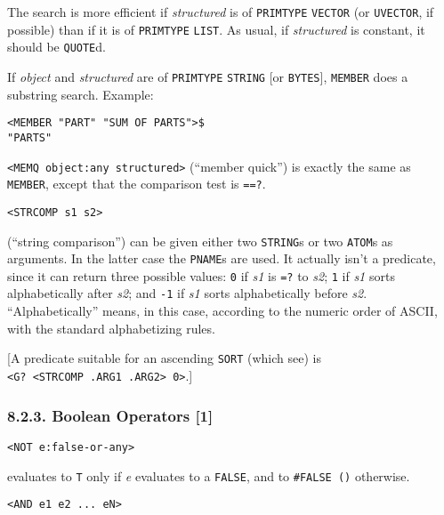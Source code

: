 \documentclass[a4paper,]{article}
\begin{document}
The search is more efficient if \emph{structured} is of \texttt{PRIMTYPE} \texttt{VECTOR} (or \texttt{UVECTOR}, if
possible) than if it is of \texttt{PRIMTYPE} \texttt{LIST}. As usual, if \emph{structured} is constant, it should be
\texttt{QUOTE}d.

If \emph{object} and \emph{structured} are of \texttt{PRIMTYPE} \texttt{STRING} {[}or \texttt{BYTES}{]}, \texttt{MEMBER}
does a substring search. Example:

\begin{verbatim}
<MEMBER "PART" "SUM OF PARTS">$
"PARTS"
\end{verbatim}

\texttt{\textless{}MEMQ\ object:any\ structured\textgreater{}} (``member quick'') is exactly
the same as \texttt{MEMBER}, except that the comparison test is \texttt{==?}.

\begin{verbatim}
<STRCOMP s1 s2>
\end{verbatim}

 (``string comparison'') can be given either two \texttt{STRING}s or two \texttt{ATOM}s as
arguments. In the latter case the \texttt{PNAME}s are used. It actually isn't a predicate, since it can return three
possible values: \texttt{0} if \emph{s1} is \texttt{=?} to \emph{s2}; \texttt{1} if \emph{s1} sorts alphabetically after
\emph{s2}; and \texttt{-1} if \emph{s1} sorts alphabetically before \emph{s2}. ``Alphabetically'' means, in this case,
according to the numeric order of ASCII, with the standard alphabetizing rules.

{[}A predicate suitable for an ascending \texttt{SORT} (which see) is
\texttt{\textless{}G?\ \textless{}STRCOMP\ .ARG1\ .ARG2\textgreater{}\ 0\textgreater{}}.{]}

\subsubsection{8.2.3. Boolean Operators {[}1{]}}\label{boolean-operators-1}

\begin{verbatim}
<NOT e:false-or-any>
\end{verbatim}

 evaluates to \texttt{T} only if \emph{e} evaluates to a \texttt{FALSE}, and to
\texttt{\#FALSE\ ()} otherwise.

\begin{verbatim}
<AND e1 e2 ... eN>
\end{verbatim}
\end{document}
